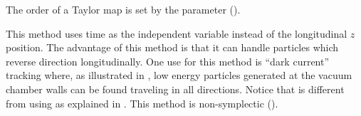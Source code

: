 \begin{description}
The order of a Taylor map is set by the 
parameter ().

\item[\vn{Time_Runge_Kutta}]
This method uses time as the independent variable instead of the longitudinal $z$ position. The
advantage of this method is that it can handle particles which reverse direction longitudinally.
One use for this method is ``dark current'' tracking where, as illustrated in ,
low energy particles generated at the vacuum chamber walls can be found traveling in all
directions. Notice that  is different from using  as
explained in . This method is non-symplectic ().

\end{description}


